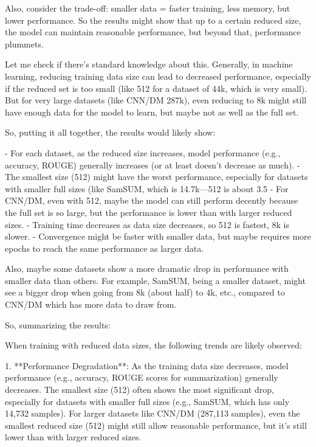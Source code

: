 Also, consider the trade-off: smaller data = faster training, less memory, but lower performance. So the results might show that up to a certain reduced size, the model can maintain reasonable performance, but beyond that, performance plummets. 

Let me check if there's standard knowledge about this. Generally, in machine learning, reducing training data size can lead to decreased performance, especially if the reduced set is too small (like 512 for a dataset of 44k, which is very small). But for very large datasets (like CNN/DM 287k), even reducing to 8k might still have enough data for the model to learn, but maybe not as well as the full set. 

So, putting it all together, the results would likely show:

- For each dataset, as the reduced size increases, model performance (e.g., accuracy, ROUGE) generally increases (or at least doesn't decrease as much). 
- The smallest size (512) might have the worst performance, especially for datasets with smaller full sizes (like SamSUM, which is 14.7k—512 is about 3.5%
- For CNN/DM, even with 512, maybe the model can still perform decently because the full set is so large, but the performance is lower than with larger reduced sizes. 
- Training time decreases as data size decreases, so 512 is fastest, 8k is slower. 
- Convergence might be faster with smaller data, but maybe requires more epochs to reach the same performance as larger data. 

Also, maybe some datasets show a more dramatic drop in performance with smaller data than others. For example, SamSUM, being a smaller dataset, might see a bigger drop when going from 8k (about half) to 4k, etc., compared to CNN/DM which has more data to draw from. 

So, summarizing the results:

When training with reduced data sizes, the following trends are likely observed:

1. **Performance Degradation**: As the training data size decreases, model performance (e.g., accuracy, ROUGE scores for summarization) generally decreases. The smallest size (512) often shows the most significant drop, especially for datasets with smaller full sizes (e.g., SamSUM, which has only 14,732 samples). For larger datasets like CNN/DM (287,113 samples), even the smallest reduced size (512) might still allow reasonable performance, but it’s still lower than with larger reduced sizes.

